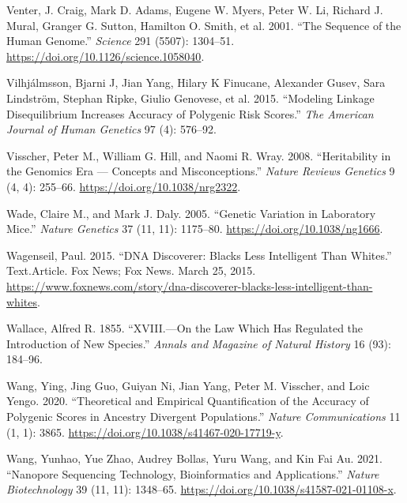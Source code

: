 \documentclass[
]{book}
\newlength{\cslhangindent}
\newlength{\cslentryspacingunit} %
\newenvironment{CSLReferences}[2] %
 {%
  \setlength{\parindent}{0pt}
  \ifodd #1
  \let\oldpar\par
  \def\par{\hangindent=\cslhangindent\oldpar}
  \fi
  \setlength{\parskip}{#2\cslentryspacingunit}
 }%
 {}
\begin{document}
\begin{CSLReferences}{1}{0}
\leavevmode{}%
Venter, J. Craig, Mark D. Adams, Eugene W. Myers, Peter W. Li, Richard J. Mural, Granger G. Sutton, Hamilton O. Smith, et al. 2001. {``The {Sequence} of the {Human Genome}.''} \emph{Science} 291 (5507): 1304--51. \url{https://doi.org/10.1126/science.1058040}.

\leavevmode{}%
Vilhjálmsson, Bjarni J, Jian Yang, Hilary K Finucane, Alexander Gusev, Sara Lindström, Stephan Ripke, Giulio Genovese, et al. 2015. {``Modeling Linkage Disequilibrium Increases Accuracy of Polygenic Risk Scores.''} \emph{The American Journal of Human Genetics} 97 (4): 576--92.

\leavevmode{}%
Visscher, Peter M., William G. Hill, and Naomi R. Wray. 2008. {``Heritability in the Genomics Era --- Concepts and Misconceptions.''} \emph{Nature Reviews Genetics} 9 (4, 4): 255--66. \url{https://doi.org/10.1038/nrg2322}.

\leavevmode{}%
Wade, Claire M., and Mark J. Daly. 2005. {``Genetic Variation in Laboratory Mice.''} \emph{Nature Genetics} 37 (11, 11): 1175--80. \url{https://doi.org/10.1038/ng1666}.

\leavevmode{}%
Wagenseil, Paul. 2015. {``{DNA Discoverer}: {Blacks Less Intelligent Than Whites}.''} Text.Article. {Fox News}; {Fox News}. March 25, 2015. \url{https://www.foxnews.com/story/dna-discoverer-blacks-less-intelligent-than-whites}.

\leavevmode{}%
Wallace, Alfred R. 1855. {``{XVIII}.---{On} the Law Which Has Regulated the Introduction of New Species.''} \emph{Annals and Magazine of Natural History} 16 (93): 184--96.

\leavevmode{}%
Wang, Ying, Jing Guo, Guiyan Ni, Jian Yang, Peter M. Visscher, and Loic Yengo. 2020. {``Theoretical and Empirical Quantification of the Accuracy of Polygenic Scores in Ancestry Divergent Populations.''} \emph{Nature Communications} 11 (1, 1): 3865. \url{https://doi.org/10.1038/s41467-020-17719-y}.

\leavevmode{}%
Wang, Yunhao, Yue Zhao, Audrey Bollas, Yuru Wang, and Kin Fai Au. 2021. {``Nanopore Sequencing Technology, Bioinformatics and Applications.''} \emph{Nature Biotechnology} 39 (11, 11): 1348--65. \url{https://doi.org/10.1038/s41587-021-01108-x}.


\end{CSLReferences}
\end{document}
